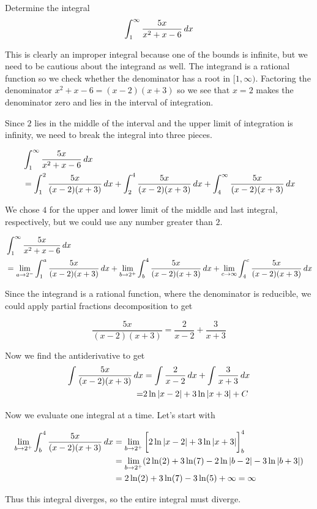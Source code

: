 \documentclass{ximera}
\begin{document}
\begin{example}
Determine the integral
\[
\int_{1}^{\infty} \frac{5x}{x^2+x-6} \mathop{}\!d x
\]


\begin{explanation}
This is clearly an improper integral because one of the bounds is infinite, but we need to be cautious about the integrand as well. The integrand is a rational function so we check whether the denominator has a root in $[1,\infty)$.  Factoring the denominator $x^2+x-6=(x-2)(x+3)$ so we see that $x=2$ makes the denominator zero and lies in the interval of integration.

Since $2$ lies in the middle of the interval and the upper limit of integration is infinity, we need to break the integral into three pieces.

\begin{align*}
& \int_{1}^{\infty} \frac{5x}{x^2+x-6} \mathop{}\!d x \\
&= \int_{1}^{2} \frac{5x}{(x-2)(x+3)} \mathop{}\!d x  + \int_{2}^{4} \frac{5x}{(x-2)(x+3)} \mathop{}\!d x + \int_{4}^{\infty} \frac{5x}{(x-2)(x+3)} \mathop{}\!d x\\
\end{align*}

We chose $4$ for the upper and lower limit of the middle and last integral, respectively, but we could use any number greater than $2$.

\begin{align*}
 & \int_{1}^{\infty} \frac{5x}{x^2+x-6} \mathop{}\!d x \\
        &=\lim_{a \to 2^{-}} \int_{1}^a \frac{5x}{(x-2)(x+3)} \mathop{}\!d x + \lim_{b \to 2^{+}} \int_{b}^{4} \frac{5x}{(x-2)(x+3)} \mathop{}\!d x +\lim_{c \to \infty} \int_{4}^{c} \frac{5x}{(x-2)(x+3)} \mathop{}\!d x
\end{align*}

Since the integrand is a rational function, where the denominator is reducible, we could apply partial fractions decomposition to get

\[
\frac{5x}{(x-2)(x+3)}=\frac{ 2}{x-2} +\frac{ 3}{x+3}
\]


Now we find the antiderivative to get
\begin{align*}
\int \frac{5x}{(x-2)(x+3)} \mathop{}\!d x&=\int \frac{ 2}{x-2} \mathop{}\!d x + \int \frac{ 3}{x+3} \mathop{}\!d x \\
=& 2\ln|x-2| + 3\ln|x+3 | + C
\end{align*}


Now we evaluate one integral at a time.  Let's start with

\begin{align*}
\lim_{b \to 2^{+}} \int_{b}^{4} \frac{5x}{(x-2)(x+3)} \mathop{}\!d x&= \lim_{b \to 2^{+}} \bigg[  2\ln|x-2| + 3\ln|x+3 |  \bigg]_{b}^{4} \\
&=\lim_{b \to 2^{+}} (2\ln(2) + 3 \ln(7) - 2\ln|b-2| -3\ln|b+3| ) \\
&=2\ln(2) +3\ln(7)-3\ln(5) + \infty=\infty
\end{align*}

Thus this integral diverges, so the entire integral must diverge.

\end{explanation}
\end{example}
\end{document}
